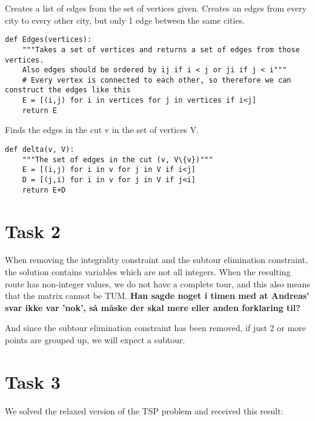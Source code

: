 \documentclass[a4paper,10pt]{article}
\begin{document}
Creates a list of edges from the set of vertices given. Creates an edges from every city to every other city, but only 1 edge between the same cities.

\begin{lstlisting}
def Edges(vertices):
    """Takes a set of vertices and returns a set of edges from those vertices. 
    Also edges should be ordered by ij if i < j or ji if j < i"""
    # Every vertex is connected to each other, so therefore we can construct the edges like this
    E = [(i,j) for i in vertices for j in vertices if i<j]
    return E
\end{lstlisting}

Finds the edges in the cut v in the set of vertices V.

\begin{lstlisting}
def delta(v, V):
    """The set of edges in the cut (v, V\{v})"""
    E = [(i,j) for i in v for j in V if i<j]
    D = [(j,i) for i in v for j in V if j<i]
    return E+D
\end{lstlisting}



\newpage
\section*{Task 2}

When removing the integrality constraint and the subtour elimination constraint, the solution contains variables which are not all integers. When the resulting route has non-integer values, we do not have a complete tour, and this also means that the matrix cannot be TUM. \textbf{Han sagde noget i timen med at Andreas' svar ikke var 'nok', så måske der skal mere eller anden forklaring til?}

And since the subtour elimination constraint has been removed, if just 2 or more points are grouped up, we will expect a subtour.


\newpage
\section*{Task 3}

We solved the relaxed version of the TSP problem and received this result:

\begin{figure}[htb]
\begin{center}
\end{center}
\end{figure}
\end{document}
